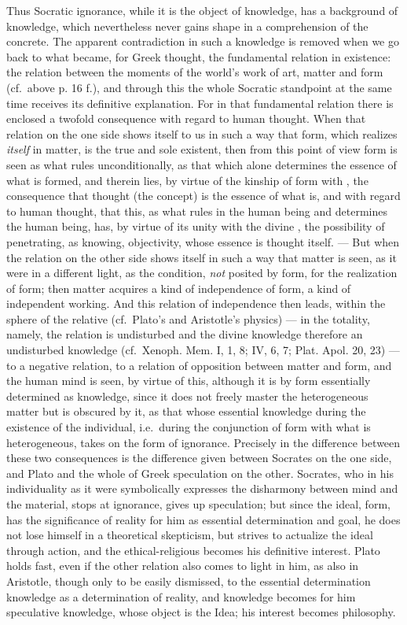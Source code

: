 Thus Socratic ignorance, while it is
the object of knowledge, has a background of knowledge, which nevertheless never gains shape in a comprehension of the concrete. The apparent contradiction in such a knowledge is removed when we go back to what became, for Greek thought, the fundamental relation in
existence: the relation between the moments of the world's work of art,
matter and form (cf.\ above p. 16 f.), and through this the whole Socratic standpoint at the same time receives its definitive explanation.
For in that fundamental relation there is enclosed a twofold
consequence with regard to human thought. When
that relation on the one side shows itself to us in such a way that
form, which realizes \emph{itself} in matter, is the true and sole
existent, then from this point of view form is seen as what rules unconditionally, as that which alone determines the essence of what is formed,
and therein lies, by virtue of the kinship of form with ,
the consequence that thought (the concept) is the essence of what is,
and with regard to human thought, that this, as
what rules in the human being and determines the human being, has, by virtue of its unity with the divine ,
the possibility of penetrating, as knowing, objectivity, whose essence is thought itself. --- But when the relation on
the other side shows itself in such a way that matter is seen, as it were in a different light, as the condition, \emph{not} posited by form, for the realization of form; then matter acquires a kind of
independence of form, a kind of independent working. And
this relation of independence then leads, within the sphere of the relative
(cf.\ Plato's and Aristotle's physics) --- in the totality,
namely, the relation is undisturbed and the divine knowledge
therefore an undisturbed knowledge (cf.\ Xenoph. Mem. I, 1, 8; IV, 6,
7; Plat. Apol. 20, 23) --- to a negative relation, to a relation of opposition between matter and form, and the human
mind is seen, by virtue of this, although it is by form essentially
determined as knowledge, since it does not freely master the heterogeneous matter but is obscured by it, as that whose essential knowledge during the existence of the individual, i.e.\ during the
conjunction of form with what is heterogeneous, takes on the form of ignorance. Precisely in the difference between these two consequences is the difference
given between Socrates on the one side, and Plato
and the whole of Greek speculation on the other. Socrates, who
in his individuality as it were symbolically expresses the disharmony
between mind and the material, stops at ignorance,
gives up speculation; but since the ideal, form, has the significance of reality for him as essential determination and goal, he does not lose
himself in a theoretical skepticism, but strives to actualize the ideal through action, and the ethical-religious
becomes his definitive interest. Plato holds fast, even if the
other relation also comes to light in him, as also in Aristotle, though only to be easily dismissed, to the essential determination knowledge as a determination of reality, and knowledge becomes
for him speculative knowledge, whose object is the Idea; his
interest becomes philosophy.

